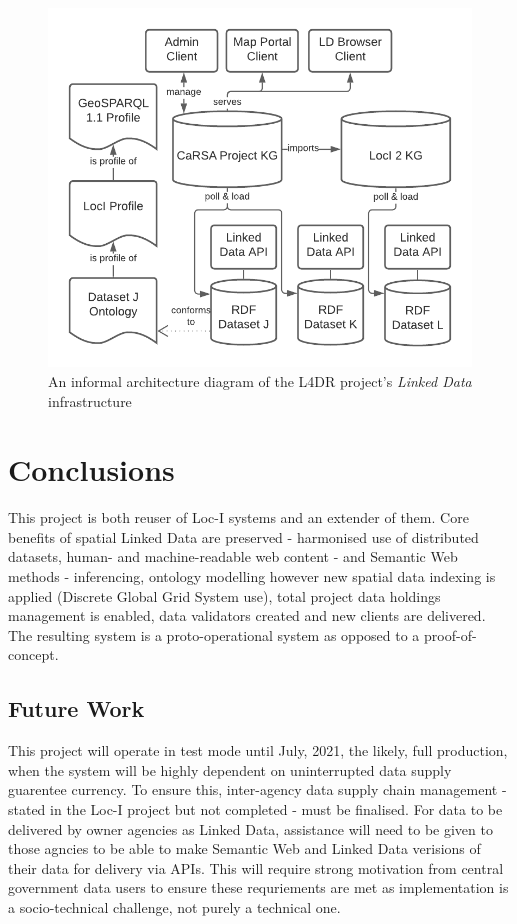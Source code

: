 \documentclass[runningheads]{llncs}
\begin{document}
\begin{figure}[htb]
    \centering
    \includegraphics[width=0.8\linewidth]{images/l4dr-arch.png}
    \caption{An informal architecture diagram of the L4DR project's \textit{Linked Data} infrastructure}
    \label{fig:l4dr-arch}
\end{figure}


\section{Conclusions}\label{sec:conclusions}
This project is both reuser of Loc-I systems and an extender of them. Core benefits of spatial Linked Data are preserved - harmonised use of distributed datasets, human- and machine-readable 
web content - and Semantic Web methods - inferencing, ontology modelling however new spatial data indexing is applied (Discrete Global Grid System use), total project data holdings management is
enabled, data validators created and new clients are delivered. The resulting system is a proto-operational system as opposed to a proof-of-concept.


\subsection{Future Work}\label{sec:futurework}
This project will operate in test mode until July, 2021, the likely, full production, when the system will be highly dependent on 
uninterrupted data supply guarentee currency. To ensure this, inter-agency data supply chain management - stated in the Loc-I project but not completed - 
must be finalised. For data to be delivered by owner agencies as Linked Data, assistance will need to be given to those agncies to be able to make Semantic Web and Linked Data verisions of their data
for delivery via APIs. This will require strong motivation from central government data users to ensure these requriements are met as implementation is a socio-technical challenge, not purely a 
technical one.
\end{document}
